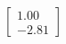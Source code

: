 \documentclass[preview]{standalone}
\begin{document}
\begin{align*}
\begin{bmatrix} 1.00 \\ -2.81 \end{bmatrix}
\end{align*}
\end{document}
